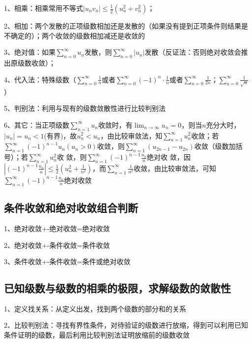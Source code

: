 1、相乘：相乘常用不等式$ |u_nv_n| \le \frac{1}{2}(u_n^2+v_n^2) $；

2、相加：两个发散的正项级数相加还是发散的（如果没有提到正项条件则结果是不确定的）；两个收敛的级数相加减还是收敛的

3、绝对值：如果$ \sum_{n=0}^{\infty}u_n $发散，则$ \sum_{n=0}^{\infty}|u_n| $发散（反证法：否则绝对收敛会推出原级数收敛）；

4、代入法：特殊级数（$ \sum_{n=0}^{\infty}\frac{1}{n} $或者$ \sum_{n=0}^{\infty}(-1)^n·\frac{1}{n} $或者$ \sum_{n=0}^{\infty}\frac{1}{2n} $；$ \sum_{n=0}^{\infty}\frac{1}{\sqrt n} $）

5、判别法：利用与现有的级数敛散性进行比较判别法

6、其它：当正项级数$ \sum_{n=1}^{\infty} u_{n} $收敛时，有$ \lim_{n \rightarrow \infty} u_{n}=0 $，则当$ n $充分大时，$ \left|u_{n}\right|=u_{n}<1 $(有界)，故$ u_{n}^{2}<u_{n} $，由比较审敛法，知$ \sum_{n=1}^{\infty} u_{n}^{2} $收敛；若$ \sum_{n=1}^{\infty}(-1)^{n-1} u_{n}\left(u_{n}>0\right) $收敛，则$ \sum_{n=1}^{\infty}\left(u_{2 n-1}-u_{2 n}\right) $收敛（级数加括号）；若$ \sum_{n=1}^{\infty} u_{n}^{2} $收 敛，则$ \sum_{n=1}^{\infty}(-1)^{n-1} \frac{u_{n}}{n} $绝对收 敛，因$ \left|(-1)^{n-1} \frac{u_{n}}{n}\right| \leqslant \frac{1}{2}\left(u_{n}^{2}+\frac{1}{n^{2}}\right) $，而$ \sum_{n=1}^{\infty} \frac{1}{n^{2}} $收敛，由比较审敛法，可知$ \sum_{n=1}^{\infty}(-1)^{n-1} \frac{u_{n}}{n} $绝对收敛



\subsection{条件收敛和绝对收敛组合判断}

1、绝对收敛+-绝对收敛=绝对收敛

2、绝对收敛+-条件收敛=条件收敛

3、条件收敛+-条件收敛=条件或绝对收敛



\subsection{已知级数与级数的相乘的极限，求解级数的敛散性}

1、定义找关系：从定义出发，找到两个级数的部分和的关系

2、比较判别法：寻找有界性条件，对待验证的级数进行放缩，得到可以利用已知条件证明的级数，最后利用比较判别法证明放缩前的级数收敛

